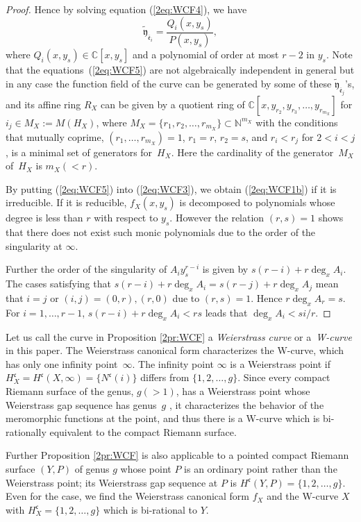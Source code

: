 \documentclass[pdftex]{sigma}
\def\CC{{\mathbb C}}
\def\NN{{\mathbb N}}
\def\fc{{\mathfrak c}}
\def\tfy{{\widetilde{\mathfrak y}}}
\def\Bfe{{\overline{\mathfrak e}}}
\numberwithin{equation}{section}
\begin{document}
\begin{proof}
Hence by solving equation (\ref{2eq:WCF4}), we have
\begin{equation}
\tfy_{\Bfe_i} = \frac{Q_{i}(x, y_s)}{P(x, y_s)},
\label{2eq:WCF5}
\end{equation}
where $Q_{i}(x, y_s) \in \CC[x,y_s]$ and a polynomial of order at most $r-2$ in $y_s$.
Note that the equations~(\ref{2eq:WCF5}) are not algebraically independent in general but in any case the function field of the curve can be generated by
some of these $\tfy_{\Bfe_j}$'s, and its affine ring $R_X$ can be given by a quotient ring of $\CC[x,y_{r_2}, y_{r_3}, \dots, y_{r_{m_X}}]$ for $i_j \in M_X:=M(H_X)$, where $M_X =\{ r_1, r_2, \dots, r_{m_X}\} \subset \NN^{{m_X}}$ with the conditions that mutually coprime, $(r_1, \dots, r_{m_X}) = 1$, $r_1=r$, $r_2=s$, and $r_i<r_j$ for $2<i<j$, is a minimal set of generators for~$H_X$. Here the cardinality of the generator~$M_X$ of~$H_X$ is $m_X (< r)$.

By putting (\ref{2eq:WCF5}) into (\ref{2eq:WCF3}), we obtain (\ref{2eq:WCF1b}) if it is irreducible.
If it is reducible, $f_X(x,y_s)$ is decomposed to polynomials whose degree is less than $r$ with respect to $y_s$. However the relation $(r,s)=1$ shows that there does not exist such monic polynomials due to the order of the singularity at $\infty$.

Further the order of the singularity of $A_i y_s^{r-i}$ is given by
$s(r-i)+r\deg_x A_i$.
The cases satisfying that $s(r-i)+r\deg_x A_i= s(r-j)+r\deg_x A_j$ mean that $i=j$ or $(i,j)=(0,r), (r,0)$ due to $(r,s)=1$. Hence $r\deg_x A_r = s$. For $i=1, \dots, r-1$, $s(r-i)+r\deg_x A_i<rs$ leads that $\deg_x A_i<s i/r$.
\end{proof}

\begin{Remark}\label{2rm:2.9}
Let us call the curve in Proposition \ref{2pr:WCF} a {\emph{Weierstrass curve}} or a~{\emph{W-curve}} in this paper.
The Weierstrass canonical form characterizes the W-curve, which has only one infinity point~$\infty$. The infinity point $\infty$ is a Weierstrass point if $H_X^\fc=H^\fc(X,\infty)=\{N^\fc(i)\}$ differs from $\{1, 2, \dots, g\}$.
Since every compact Riemann surface of the genus, $g(>1)$, has a Weierstrass point whose Weierstrass gap sequence has genus~$g$ \cite{ACGH85, FarkasKra}, it characterizes the behavior of the meromorphic functions at the point, and thus there is a W-curve which is bi-rationally equivalent to the compact Riemann surface.

Further Proposition \ref{2pr:WCF} is also applicable to a pointed compact Riemann surface $(Y, P)$ of genus $g$ whose point $P$ is an ordinary point rather than the Weierstrass point; its Weierstrass gap sequence at $P$ is $H^\fc(Y, P)=\{1, 2, \dots, g\}$.
Even for the case, we find the Weierstrass canonical form $f_X$ and the W-curve $X$ with $H_X^\fc=\{1, 2, \dots, g\}$ which is bi-rational to $Y$.
\end{Remark}
\end{document}
